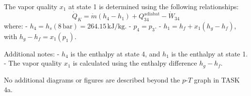 The vapor quality \( x_1 \) at state 1 is determined using the following relationships:  
\[
\dot{Q}_K = \dot{m} (h_4 - h_1) + Q_{34}^{\text{adiabat}} - \dot{W}_{34}
\]  
where:  
- \( h_4 = h_s(8 \, \text{bar}) = 264.15 \, \text{kJ/kg} \).  
- \( p_4 = p_3 \).  
- \( h_1 = h_f + x_1 (h_g - h_f) \), with \( h_g - h_f = x_1 (p_1) \).  

Additional notes:  
- \( h_4 \) is the enthalpy at state 4, and \( h_1 \) is the enthalpy at state 1.  
- The vapor quality \( x_1 \) is calculated using the enthalpy difference \( h_g - h_f \).  

No additional diagrams or figures are described beyond the \(p\)-\(T\) graph in TASK 4a.